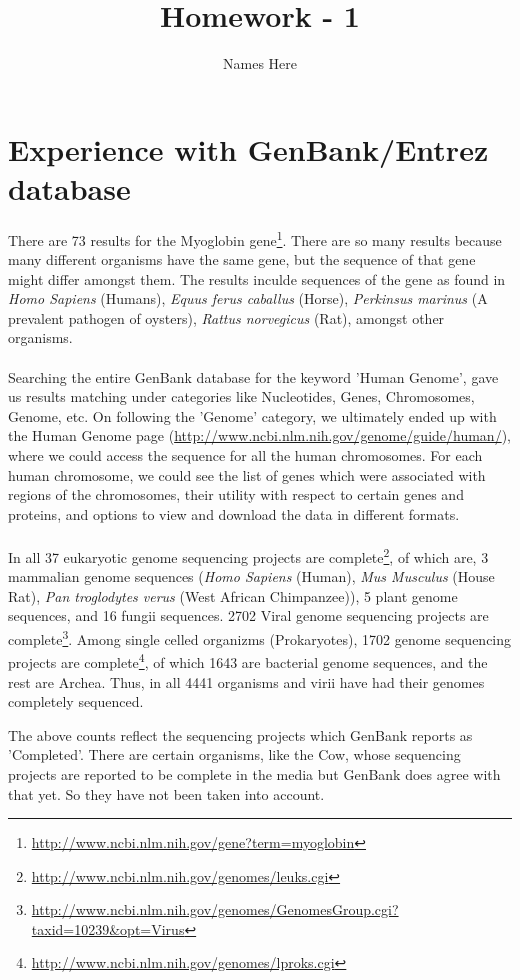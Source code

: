 \documentclass{article}
\title{Homework - 1}
\author{Names Here}
\begin{document}
\maketitle

\clearpage


\section{Experience with GenBank/Entrez database}
There are 73 results for the Myoglobin gene\footnote{\url{http://www.ncbi.nlm.nih.gov/gene?term=myoglobin}}. There are so many results because many different organisms have the same gene, but the sequence of that gene might differ amongst them.
The results inculde sequences of the gene as found in \textit{Homo Sapiens} (Humans), \textit{Equus ferus caballus} (Horse), \textit{Perkinsus marinus} (A prevalent pathogen of oysters), \textit{Rattus norvegicus} (Rat), amongst other organisms.\\
\\
Searching the entire GenBank database for the keyword 'Human Genome', gave us results matching under categories like Nucleotides, Genes, Chromosomes, Genome, etc. On following the 'Genome' category, we ultimately ended up with the Human Genome page (\url{http://www.ncbi.nlm.nih.gov/genome/guide/human/}), where we could access the sequence for all the human chromosomes. For each human chromosome, we could see the list of genes which were associated with regions of the chromosomes, their utility with respect to certain genes and proteins, and options to view and download the data in different formats.\\
\\
In all 37 eukaryotic genome sequencing projects are complete\footnote{\url{http://www.ncbi.nlm.nih.gov/genomes/leuks.cgi}}, of which are, 3 mammalian genome sequences (\textit{Homo Sapiens} (Human), \textit{Mus Musculus} (House Rat), \textit{Pan troglodytes verus} (West African Chimpanzee)), 5 plant genome sequences, and 16 fungii sequences. 2702 Viral genome sequencing projects are complete\footnote{\url{http://www.ncbi.nlm.nih.gov/genomes/GenomesGroup.cgi?taxid=10239&opt=Virus}}. Among single celled organizms (Prokaryotes), 1702 genome sequencing projects are complete\footnote{\url{http://www.ncbi.nlm.nih.gov/genomes/lproks.cgi}}, of which 1643 are bacterial genome sequences, and the rest are Archea. Thus, in all 4441 organisms and virii have had their genomes completely sequenced.

The above counts reflect the sequencing projects which GenBank reports as 'Completed'. There are certain organisms, like the Cow, whose sequencing projects are reported to be complete in the media but GenBank does agree with that yet. So they have not been taken into account.
\clearpage
\end{document}
